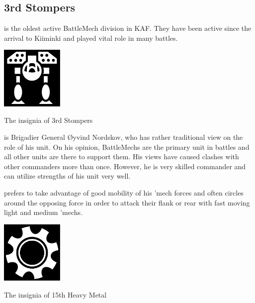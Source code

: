 \documentclass{tufte-book}
\begin{document}
\subsection{3rd Stompers}

 is the oldest active BattleMech division in KAF.
They have been active since the arrival to Kiiminki and played vital role in
many battles.

\begin{marginfigure}[0\baselineskip]
  \includegraphics[width=3cm]{missile-mech}
  \caption{The insignia of 3rd Stompers}
  \label{fig:stompers}
\end{marginfigure}

 is Brigadier General \O yvind
Nordskov, who has rather traditional view on the role of his unit. On his
opinion, BattleMechs are the primary unit in battles and all other units are
there to support them. His views have caused clashes with other commanders
more than once. However, he is very skilled commander and can utilize
strengths of his unit very well.

 prefers to take advantage of good
mobility of his 'mech forces and often circles around the opposing force in
order to attack their flank or rear with fast moving light and medium 'mechs.

\bigskip
{}

\begin{marginfigure}[0\baselineskip]
  \includegraphics[width=3cm]{cog}
  \caption{The insignia of 15th Heavy Metal}
  \label{fig:heavy_metal}
\end{marginfigure}
\end{document}
